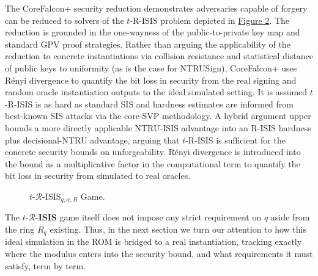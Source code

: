 The CoreFalcon+ security reduction demonstrates adversaries capable of forgery can be reduced to
solvers of the \(t\)-R-ISIS problem depicted in \hyperref[fig:t-r-isis-game]{Figure 2}. The reduction is grounded in the one-wayness of the 
public-to-private key map and standard GPV proof strategies. Rather than arguing the 
applicability of the reduction to concrete instantiations via collision resistance and 
statistical distance of 
public keys to uniformity (as is the case for NTRUSign), CoreFalcon+ uses Rényi divergence 
to quantify the bit loss in security from the real signing and random oracle instantiation 
outputs to the ideal simulated setting. It is assumed \(t\)-R-ISIS is as hard as standard 
SIS and hardness estimates are informed from best-known SIS attacks via the
core-SVP methodology. A hybrid argument upper bounds a more directly applicable NTRU-ISIS 
advantage into an R-ISIS hardness plus decisional-NTRU advantage, arguing that 
\(t\)-R-ISIS is sufficient for the concrete security bounds on unforgeability. Rényi 
divergence is introduced into the bound as a multiplicative factor in the
computational term to quantify the bit loss in security from simulated to real oracles.

\begin{figure}[ht]
  \centering
  \setlength{\fboxsep}{7pt}
  \caption{$t$-$\mathcal{R}$-ISIS$_{q,\alpha,B}$ Game.}
  \label{fig:t-r-isis-game}
\end{figure}

The $t\text{-}\mathcal{R}\text{-}\mathbf{ISIS}$ game itself does not impose any strict requirement 
on $q$ aside from the ring $R_q$ existing. Thus, in the next section we turn our attention to how 
this ideal simulation in the ROM is bridged to a real instantiation, tracking exactly where the 
modulus enters into the security bound, and what requirements it must satisfy, term by term. 

